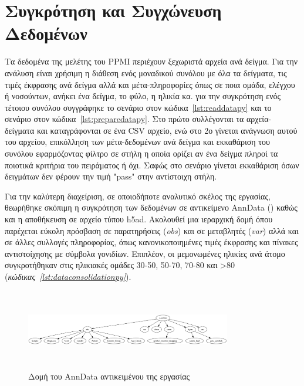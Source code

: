 \documentclass[12pt]{report}
\begin{document}
    \section{Συγκρότηση και Συγχώνευση Δεδομένων}
        \par
            Τα δεδομένα της μελέτης του PPMI περιέχουν ξεχωριστά αρχεία ανά δείγμα. Για την ανάλυση είναι χρήσιμη η διάθεση ενός μοναδικού συνόλου με όλα τα δείγματα, τις τιμές έκφρασης ανά δείγμα αλλά και μέτα-πληροφορίες όπως σε ποια ομάδα, ελέγχου ή νοσούντων, ανήκει ένα δείγμα, το φύλο, η ηλικία κα. για την συγκρότηση ενός τέτοιου συνόλου συγγράφηκε το σενάριο στον κώδικα~\ref{lst:readdatapy} και το σενάριο στον κώδικα~\ref{lst:preparedatapy}. Στο πρώτο συλλέγονται τα αρχεία-δείγματα και καταγράφονται σε ένα CSV αρχείο, ενώ στο 2ο γίνεται ανάγνωση αυτού του αρχείου, επικόλληση των μέτα-δεδομένων ανά δείγμα και εκκαθάριση του συνόλου εφαρμόζοντας φίλτρο σε στήλη η οποία ορίζει αν ένα δείγμα πληροί τα ποιοτικά κριτήρια του πειράματος ή όχι. Σαφώς στο σενάριο γίνεται εκκαθάριση όσων δειγμάτων δεν φέρουν την τιμή "pass" στην αντίστοιχη στήλη.
        \par
            Για την καλύτερη διαχείριση, σε οποιοδήποτε αναλυτικό σκέλος της εργασίας, θεωρήθηκε σκόπιμη η συγκρότηση των δεδομένων σε αντικείμενο AnnData (\emph{\cite{Virshup2024Anndata:Matrices}}) καθώς και η αποθήκευση σε αρχείο τύπου h5ad. Ακολουθεί μια ιεραρχική δομή όπου παρέχεται εύκολη πρόσβαση σε παρατηρήσεις (\emph{obs}) και σε μεταβλητές (\emph{var}) αλλά και σε άλλες συλλογές πληροφορίας, όπως κανονικοποιημένες τιμές έκφρασης και πίνακες αντιστοίχησης με σύμβολα γονιδίων. Επιπλέον, οι μεμονωμένες ηλικίες ανά άτομο συγκροτήθηκαν στις ηλικιακές ομάδες 30-50, 50-70, 70-80 και >80 (\emph{κώδικας~\ref{lst:dataconsolidationpy}}).
            \begin{figure}[h]
                \centering
                \includegraphics[width=0.8\textwidth,height=3.5cm]{anndata_structure.png}
                \caption{Δομή του AnnData αντικειμένου της εργασίας}
                \label{fig:figure-1}
            \end{figure}
\end{document}
